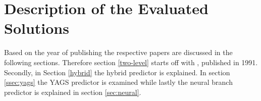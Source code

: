 \documentclass[conference]{IEEEtran}
\begin{document}




\maketitle




\IEEEpeerreviewmaketitle






\section{Description of the Evaluated Solutions}
Based on the year of publishing the respective papers are discussed in the following sections. Therefore section \ref{two-level} starts off with , published in 1991. Secondly, in Section \ref{hybrid} the hybrid predictor is explained. In section \ref{ssec:yags} the YAGS predictor is examined while lastly the neural branch predictor is explained in section \ref{sec:neural}.





\end{document}
